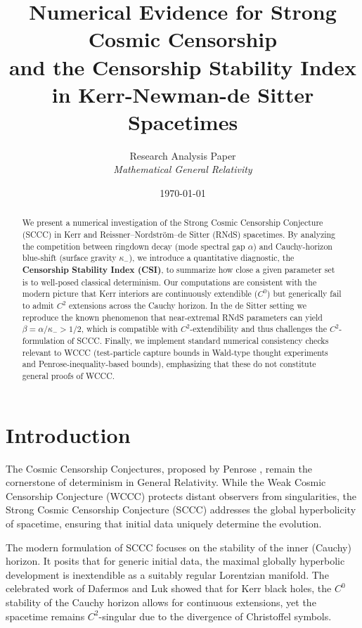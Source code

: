 \documentclass[12pt,a4paper]{article}
\title{\textbf{Numerical Evidence for Strong Cosmic Censorship\\
and the Censorship Stability Index in Kerr-Newman-de Sitter Spacetimes}}
\author{Research Analysis Paper\\
\textit{Mathematical General Relativity}}
\date{\today}
\begin{document}
\maketitle

\begin{abstract}
We present a numerical investigation of the Strong Cosmic Censorship Conjecture (SCCC) in Kerr and Reissner--Nordström--de Sitter (RNdS) spacetimes. By analyzing the competition between ringdown decay (mode spectral gap $\alpha$) and Cauchy-horizon blue-shift (surface gravity $\kappa_-$), we introduce a quantitative diagnostic, the \textbf{Censorship Stability Index (CSI)}, to summarize how close a given parameter set is to well-posed classical determinism. Our computations are consistent with the modern picture that Kerr interiors are continuously extendible ($C^0$) but generically fail to admit $C^2$ extensions across the Cauchy horizon. In the de Sitter setting we reproduce the known phenomenon that near-extremal RNdS parameters can yield $\beta=\alpha/\kappa_- > 1/2$, which is compatible with $C^2$-extendibility and thus challenges the $C^2$-formulation of SCCC. Finally, we implement standard numerical consistency checks relevant to WCCC (test-particle capture bounds in Wald-type thought experiments and Penrose-inequality-based bounds), emphasizing that these do not constitute general proofs of WCCC.
\end{abstract}

\section{Introduction}

The Cosmic Censorship Conjectures, proposed by Penrose \cite{penrose1969}, remain the cornerstone of determinism in General Relativity. While the Weak Cosmic Censorship Conjecture (WCCC) protects distant observers from singularities, the Strong Cosmic Censorship Conjecture (SCCC) addresses the global hyperbolicity of spacetime, ensuring that initial data uniquely determine the evolution.

The modern formulation of SCCC focuses on the stability of the inner (Cauchy) horizon. It posits that for generic initial data, the maximal globally hyperbolic development is inextendible as a suitably regular Lorentzian manifold. The celebrated work of Dafermos and Luk \cite{dafermos2017} showed that for Kerr black holes, the $C^0$ stability of the Cauchy horizon allows for continuous extensions, yet the spacetime remains $C^2$-singular due to the divergence of Christoffel symbols.
\end{document}
